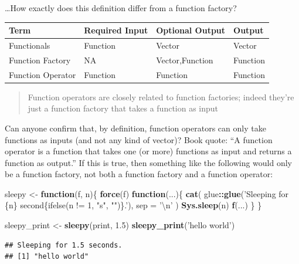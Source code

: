 \documentclass[]{book}
\newenvironment{Shaded}{\begin{snugshade}}{\end{snugshade}}
\newcommand{\CharTok}[1]{\textcolor[rgb]{0.31,0.60,0.02}{#1}}
\newcommand{\ControlFlowTok}[1]{\textcolor[rgb]{0.13,0.29,0.53}{\textbf{#1}}}
\newcommand{\DataTypeTok}[1]{\textcolor[rgb]{0.13,0.29,0.53}{#1}}
\newcommand{\FloatTok}[1]{\textcolor[rgb]{0.00,0.00,0.81}{#1}}
\newcommand{\KeywordTok}[1]{\textcolor[rgb]{0.13,0.29,0.53}{\textbf{#1}}}
\newcommand{\NormalTok}[1]{#1}
\newcommand{\OperatorTok}[1]{\textcolor[rgb]{0.81,0.36,0.00}{\textbf{#1}}}
\newcommand{\StringTok}[1]{\textcolor[rgb]{0.31,0.60,0.02}{#1}}
\begin{document}
\ldots{}How exactly does this definition differ from a function factory?

\captionsetup[table]{labelformat=empty,skip=1pt}
\begin{longtable}{llll}
\toprule
Term & Required Input & Optional Output & Output \\ 
\midrule
Functionals & Function & Vector & Vector \\ 
Function Factory & NA & Vector,Function & Function \\ 
Function Operator & Function & Function & Function \\ 
\bottomrule
\end{longtable}

\begin{quote}
Function operators are closely related to function factories; indeed they're just a function factory that takes a function as input
\end{quote}

Can anyone confirm that, by definition, function operators can only take functions as inputs (and not any kind of vector)? Book quote: ``A function operator is a function that takes one (or more) functions as input and returns a function as output.'' If this is true, then something like the following would only be a function factory, not both a function factory and a function operator:

\begin{Shaded}
\begin{Highlighting}[]
\NormalTok{sleepy <-}\StringTok{ }\ControlFlowTok{function}\NormalTok{(f, n)\{}
  \KeywordTok{force}\NormalTok{(f)}
  \ControlFlowTok{function}\NormalTok{(...)\{}
    \KeywordTok{cat}\NormalTok{(}
\NormalTok{      glue}\OperatorTok{::}\KeywordTok{glue}\NormalTok{(}\StringTok{'Sleeping for \{n\} second\{ifelse(n != 1, "s", "")\}.'}\NormalTok{), }
      \DataTypeTok{sep =} \StringTok{'}\CharTok{\textbackslash{}n}\StringTok{'}
\NormalTok{    )}
    \KeywordTok{Sys.sleep}\NormalTok{(n)}
    \KeywordTok{f}\NormalTok{(...)}
\NormalTok{  \}}
\NormalTok{\}}

\NormalTok{sleepy_print <-}\StringTok{ }\KeywordTok{sleepy}\NormalTok{(print, }\FloatTok{1.5}\NormalTok{)}
\KeywordTok{sleepy_print}\NormalTok{(}\StringTok{'hello world'}\NormalTok{)}
\end{Highlighting}
\end{Shaded}

\begin{verbatim}
## Sleeping for 1.5 seconds.
## [1] "hello world"
\end{verbatim}
\end{document}
